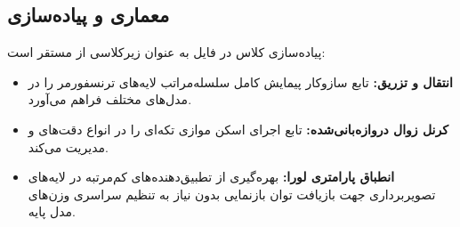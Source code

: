 \subsection{معماری و پیاده‌سازی}
پیاده‌سازی کلاس  در فایل  به عنوان زیرکلاسی از  مستقر است:
\begin{itemize}
    \item \textbf{انتقال و تزریق:} تابع  سازوکار پیمایش کامل سلسله‌مراتب لایه‌های ترنسفورمر را در مدل‌های مختلف فراهم می‌آورد.
    \item \textbf{کرنل زوال دروازه‌بانی‌شده:} تابع  اجرای اسکن موازی تکه‌ای را در انواع دقت‌های  و  مدیریت می‌کند.
    \item \textbf{انطباق پارامتری لورا:} بهره‌گیری از تطبیق‌دهنده‌های کم‌مرتبه در لایه‌های تصویربرداری جهت بازیافت توان بازنمایی بدون نیاز به تنظیم سراسری وزن‌های مدل پایه.
\end{itemize}
